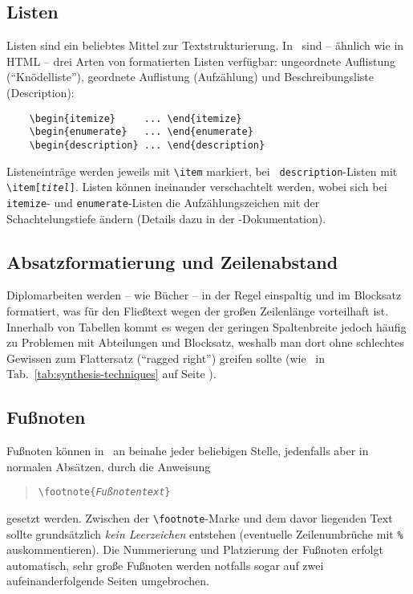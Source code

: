 \subsection{Listen}

Listen sind ein beliebtes Mittel zur Textstrukturierung. In
\latex\ sind -- ähnlich wie in HTML -- drei Arten von formatierten
Listen verfügbar: ungeordnete Auflistung ("`Knödelliste"'),
geordnete Auflistung (Aufzählung) und Beschreibungsliste
(Description):
%
\begin{verbatim}
    \begin{itemize}     ... \end{itemize}
    \begin{enumerate}   ... \end{enumerate}
    \begin{description} ... \end{description}
\end{verbatim}
%
Listeneinträge werden jeweils mit \verb!\item! markiert, bei {\tt
description}-Listen mit \verb!\item[!\texttt{\em titel}\verb!]!. Listen
können ineinander verschachtelt werden, wobei sich bei {\tt
itemize}- und \texttt{enumerate}-Listen die Aufzählungszeichen mit
der Schachtelungstiefe ändern (Details dazu in der
\latex-Dokumentation).


\subsection{Absatzformatierung und Zeilenabstand}

Diplomarbeiten werden -- wie Bücher -- in der Regel einspaltig und
im Blocksatz formatiert, was für den Fließtext wegen der großen
Zeilenlänge vorteilhaft ist. Innerhalb von Tabellen kommt es
wegen der geringen Spaltenbreite jedoch häufig zu Problemen mit
Abteilungen und Blocksatz, weshalb man dort ohne schlechtes
Gewissen zum Flattersatz ("`ragged right"') greifen sollte (wie
\zB\ in Tab.~\ref{tab:synthesis-techniques} auf Seite
\pageref{tab:synthesis-techniques}).

\subsection{Fußnoten}
Fußnoten können in \latex\ an beinahe jeder beliebigen Stelle,
jedenfalls aber in normalen Absätzen, durch die Anweisung
%
\begin{quote}
\verb!\footnote{!\texttt{\em Fußnotentext}\verb!}!
\end{quote}
%
gesetzt werden. Zwischen der \verb!\footnote!-Marke und dem davor
liegenden Text sollte grundsätzlich \emph{kein Leerzeichen} entstehen (eventuelle
Zeilen\-um\-brüche mit \verb!%! auskommentieren).
Die Nummerierung und Platzierung der Fußnoten
erfolgt automatisch, sehr große Fußnoten werden notfalls sogar auf
zwei aufeinanderfolgende Seiten umgebrochen.



